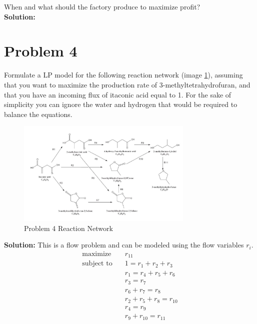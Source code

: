 \documentclass[11pt]{article}
\begin{document}
When and what should the factory produce to maximize profit?
\\
\textbf{Solution: }

\section{Problem 4}
Formulate a LP model for the following reaction network (image \ref{fig:problem_4_rn}), assuming that you want
to maximize the production rate of 3-methyltetrahydrofuran, and that you have an incoming
flux of itaconic acid equal to 1. For the sake of simplicity you can ignore the water and
hydrogen that would be required to balance the equations.
\begin{figure}[htbp]
  \centerline{\includegraphics[width=0.75\textwidth]{images/image.png}}
  \caption{Problem 4 Reaction Network}
  \label{fig:problem_4_rn}
\end{figure}

\textbf{Solution: }
This is a flow problem and can be modeled using the flow variables $r_i$.
\begin{align*}
  \text{maximize} & \quad r_{11} \\
  \text{subject to} & \quad 1 = r_1 + r_2 + r_3 \\
  & \quad r_1 = r_4 + r_5 + r_6 \\
  & \quad r_3 = r_7 \\
  & \quad r_6 + r_7 = r_8 \\
  & \quad r_2 + r_5 + r_8 = r_{10} \\
  & \quad r_4 = r_9 \\
  & \quad r_9 + r_{10} = r_{11}
\end{align*}
\end{document}
